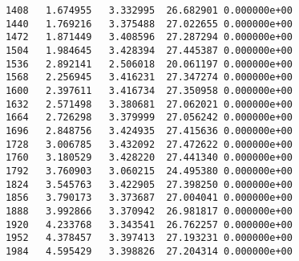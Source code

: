 \documentclass{article}
\begin{document}
\begin{verbatim}
      1408   1.674955   3.332995  26.682901 0.000000e+00
      1440   1.769216   3.375488  27.022655 0.000000e+00
      1472   1.871449   3.408596  27.287294 0.000000e+00
      1504   1.984645   3.428394  27.445387 0.000000e+00
      1536   2.892141   2.506018  20.061197 0.000000e+00
      1568   2.256945   3.416231  27.347274 0.000000e+00
      1600   2.397611   3.416734  27.350958 0.000000e+00
      1632   2.571498   3.380681  27.062021 0.000000e+00
      1664   2.726298   3.379999  27.056242 0.000000e+00
      1696   2.848756   3.424935  27.415636 0.000000e+00
      1728   3.006785   3.432092  27.472622 0.000000e+00
      1760   3.180529   3.428220  27.441340 0.000000e+00
      1792   3.760903   3.060215  24.495380 0.000000e+00
      1824   3.545763   3.422905  27.398250 0.000000e+00
      1856   3.790173   3.373687  27.004041 0.000000e+00
      1888   3.992866   3.370942  26.981817 0.000000e+00
      1920   4.233768   3.343541  26.762257 0.000000e+00
      1952   4.378457   3.397413  27.193231 0.000000e+00
      1984   4.595429   3.398826  27.204314 0.000000e+00
\end{verbatim}
\end{document}
